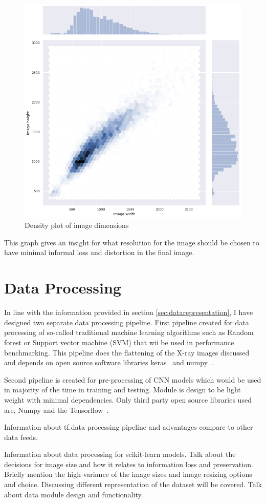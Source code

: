 \begin{figure}[H]
    \centering
    \includegraphics[width=\textwidth]{img/image_dims_density.png}
    \caption{Density plot of image dimensions}
    \label{fig:imagedimensions}
\end{figure}

This graph gives an insight for what resolution for the image should be chosen to have minimal informal loss and distortion in the final image.

\section{Data Processing} \label{sec:dataprocessing}
In line with the information provided in section \ref{sec:datarepresentation}, I have designed two separate data processing pipeline.
First pipeline created for data processing of so-called traditional machine learning algorithms such as Random forest or Support vector machine (SVM) that wii be used in performance benchmarking.
This pipeline does the flattening of the X-ray images discussed and depends on open source software libraries keras~\cite{keras} and numpy~\cite{numpy}.

Second pipeline is created for pre-processing of CNN models which would be used in majority of the time in training and testing.
Module is design to be light weight with minimal dependencies. Only third party open source libraries used are, Numpy and the Tensorflow~\cite{tensorflow}.



Information about tf.data processing pipeline and advantages compare to other data feeds.

Information about data processing for scikit-learn models.
Talk about the decisions for image size and how it relates to information loss and preservation. Briefly mention the high variance of the image sizes and image resizing options and choice.
Discussing different representation of the dataset will be covered.
Talk about data module design and functionality.
\clearpage